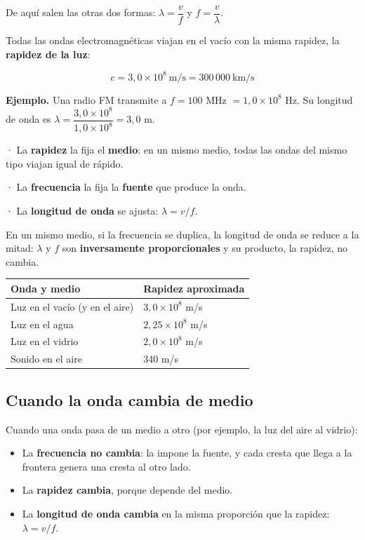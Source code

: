 De aquí salen las otras dos formas: $\lambda = \dfrac{v}{f}$ y $f = \dfrac{v}{\lambda}$.

 

Todas las ondas electromagnéticas viajan en el vacío con la misma rapidez, la \textbf{rapidez de la luz}:

 \[ c = 3{,}0\times10^{8}\ \text{m/s} = 300\,000\ \text{km/s} \] 

\textbf{Ejemplo.} Una radio FM transmite a $f = 100$ MHz $= 1{,}0\times10^{8}$ Hz. Su longitud de onda es $\lambda = \dfrac{3{,}0\times10^{8}}{1{,}0\times10^{8}} = 3{,}0$ m.

  
\begin{clave} · La \textbf{rapidez} la fija el \textbf{medio}: en un mismo medio, todas las ondas del mismo tipo viajan igual de rápido.\par · La \textbf{frecuencia} la fija la \textbf{fuente} que produce la onda.\par · La \textbf{longitud de onda} se ajusta: $\lambda = v/f$.\end{clave}
 
\begin{clave}[{Recuerda}] En un mismo medio, si la frecuencia se duplica, la longitud de onda se reduce a la mitad: $\lambda$ y $f$ son \textbf{inversamente proporcionales} y su producto, la rapidez, no cambia.\end{clave}
 
\begin{center}\small
\begin{tabular}{@{}ll@{}}
\toprule
\textbf{Onda y medio} & \textbf{Rapidez aproximada} \\
\midrule
Luz en el vacío (y en el aire) & $3{,}0\times10^{8}$ m/s \\
Luz en el agua & $2{,}25\times10^{8}$ m/s \\
Luz en el vidrio & $2{,}0\times10^{8}$ m/s \\
Sonido en el aire & 340 m/s \\
\bottomrule
\end{tabular}
\end{center}
\subsection{Cuando la onda cambia de medio}
Cuando una onda pasa de un medio a otro (por ejemplo, la luz del aire al vidrio):

 
\begin{itemize}
  \item La \textbf{frecuencia no cambia}: la impone la fuente, y cada cresta que llega a la frontera genera una cresta al otro lado.
  \item La \textbf{rapidez cambia}, porque depende del medio.
  \item La \textbf{longitud de onda cambia} en la misma proporción que la rapidez: $\lambda = v/f$.
\end{itemize}
 

